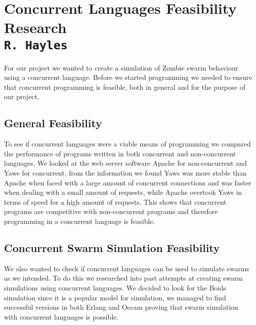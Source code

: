 \pagestyle{empty}
\section{Concurrent Languages Feasibility Research\\{\small\tt R.~Hayles}}
For our project we wanted to create a simulation of Zombie swarm behaviour using a concurrent language. Before we started programming we needed to ensure that concurrent programming is  feasible, both in general and for the purpose of our project.

\subsection{General Feasibility}
To see if concurrent languages were a viable means of programming we compared the performance of programs written in both concurrent and non-concurrent languages. We looked at the web server software Apache for non-concurrent and Yaws for concurrent, from the information we found Yaws was more stable than Apache when faced with a large amount of concurrent connections and was faster when dealing with a small amount of requests, while Apache overtook Yaws in terms of speed for a high amount of requests. This shows that concurrent programs are competitive with non-concurrent programs and therefore programming in a concurrent language is feasible.

\subsection{Concurrent Swarm Simulation Feasibility}
We also wanted to check if concurrent languages can be used to simulate swarms as we intended. To do this we researched into past attempts at creating swarm simulations using concurrent languages. We decided to look for the Boids simulation since it is a popular model for simulation, we managed to find successful versions in both Erlang and Occam proving that swarm simulation with concurrent languages is possible.
\clearpage
\endinput
